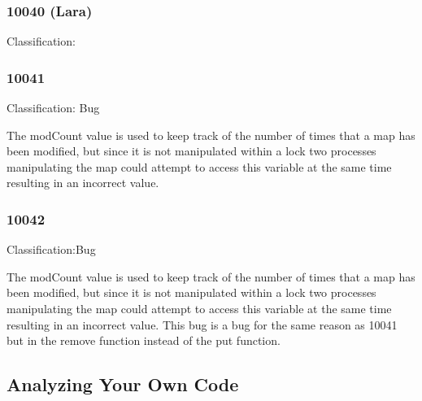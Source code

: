 \documentclass[12pt]{article}
\begin{document}
\subsubsection{10040 (Lara)}
Classification:

\subsubsection{10041}
Classification: Bug

The modCount value is used to keep track of the number of times that a map has been modified, but since it is not manipulated within a lock two processes manipulating the map could attempt to access this variable at the same time resulting in an incorrect value.


\subsubsection{10042}
Classification:Bug

The modCount value is used to keep track of the number of times that a map has been modified, but since it is not manipulated within a lock two processes manipulating the map could attempt to access this variable at the same time resulting in an incorrect value. This bug is a bug for the same reason as 10041 but in the remove function instead of the put function.


\subsection{Analyzing Your Own Code}
\end{document}
